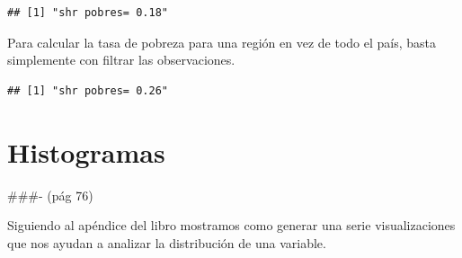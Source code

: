 \documentclass[
]{book}
\newenvironment{Shaded}{\begin{snugshade}}{\end{snugshade}}
\newcommand{\AttributeTok}[1]{\textcolor[rgb]{0.77,0.63,0.00}{#1}}
\newcommand{\CommentTok}[1]{\textcolor[rgb]{0.56,0.35,0.01}{\textit{#1}}}
\newcommand{\ConstantTok}[1]{\textcolor[rgb]{0.00,0.00,0.00}{#1}}
\newcommand{\DecValTok}[1]{\textcolor[rgb]{0.00,0.00,0.81}{#1}}
\newcommand{\DocumentationTok}[1]{\textcolor[rgb]{0.56,0.35,0.01}{\textbf{\textit{#1}}}}
\newcommand{\FunctionTok}[1]{\textcolor[rgb]{0.00,0.00,0.00}{#1}}
\newcommand{\NormalTok}[1]{#1}
\newcommand{\OtherTok}[1]{\textcolor[rgb]{0.56,0.35,0.01}{#1}}
\newcommand{\SpecialCharTok}[1]{\textcolor[rgb]{0.00,0.00,0.00}{#1}}
\newcommand{\StringTok}[1]{\textcolor[rgb]{0.31,0.60,0.02}{#1}}
\begin{document}
\begin{Shaded}
\end{Shaded}

\begin{verbatim}
## [1] "shr pobres= 0.18"
\end{verbatim}

Para calcular la tasa de pobreza para una región en vez de todo el país, basta simplemente con filtrar las observaciones.

\begin{Shaded}
\end{Shaded}

\begin{verbatim}
## [1] "shr pobres= 0.26"
\end{verbatim}

\hypertarget{histogramas}{%
\section{Histogramas}\label{histogramas}}

\#\#\#- (pág 76)

Siguiendo al apéndice del libro mostramos como generar una serie visualizaciones que nos ayudan a analizar la distribución de una variable.
\end{document}
